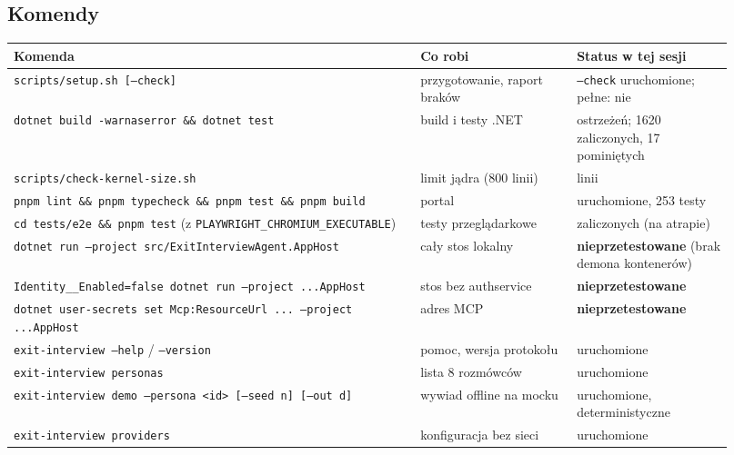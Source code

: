 {\subsection{Komendy}

\begin{center}
\scriptsize
\begin{longtable}{@{}>{\raggedright\arraybackslash}p{0.52\linewidth}>{\raggedright\arraybackslash}p{0.2\linewidth}>{\raggedright\arraybackslash}p{0.2\linewidth}@{}}
\toprule
Komenda & Co robi & Status w tej sesji \\
\midrule
\endhead
\texttt{scripts/\allowbreak{}setup.\allowbreak{}sh [--check]} & przygotowanie, raport braków & \texttt{--check} uruchomione; pełne: nie \\
\texttt{dotnet build -warnaserror \&\& dotnet test} & build i testy .NET & 0 ostrzeżeń; 1620 zaliczonych, 17 pominiętych \\
\texttt{scripts/\allowbreak{}check-\allowbreak{}kernel-\allowbreak{}size.\allowbreak{}sh} & limit jądra (800 linii) & 320 linii \\
\texttt{pnpm lint \&\& pnpm typecheck \&\& pnpm test \&\& pnpm build} & portal & uruchomione, 253 testy \\
\texttt{cd tests/\allowbreak{}e2e \&\& pnpm test} (z \texttt{PLAYWRIGHT\_\allowbreak{}CHROMIUM\_\allowbreak{}EXECUTABLE}) & testy przeglądarkowe & 115 zaliczonych (na atrapie) \\
\texttt{dotnet run --project src/\allowbreak{}ExitInterviewAgent.\allowbreak{}AppHost} & cały stos lokalny & \textbf{nieprzetestowane} (brak demona kontenerów) \\
\texttt{Identity\_\allowbreak{}\_\allowbreak{}Enabled=false dotnet run --project ...AppHost} & stos bez authservice & \textbf{nieprzetestowane} \\
\texttt{dotnet user-\allowbreak{}secrets set Mcp:\allowbreak{}ResourceUrl ... --project ...AppHost} & adres MCP & \textbf{nieprzetestowane} \\
\texttt{exit-\allowbreak{}interview --help} / \texttt{--version} & pomoc, wersja protokołu & uruchomione \\
\texttt{exit-\allowbreak{}interview personas} & lista 8 rozmówców & uruchomione \\
\texttt{exit-\allowbreak{}interview demo --persona <id> [--seed n] [--out d]} & wywiad offline na mocku & uruchomione, deterministyczne \\
\texttt{exit-\allowbreak{}interview providers} & konfiguracja bez sieci & uruchomione \\

\end{longtable}
\end{center}}

